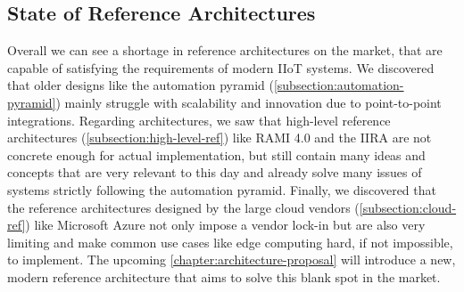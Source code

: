 \subsection{State of Reference Architectures}
    Overall we can see a shortage in reference architectures on the market, that are capable of satisfying the requirements of modern  IIoT systems. We discovered that older designs like the automation pyramid (\autoref{subsection:automation-pyramid}) mainly struggle with scalability and innovation due to point-to-point integrations. Regarding architectures, we saw that high-level reference architectures (\autoref{subsection:high-level-ref}) like RAMI 4.0 and the IIRA are not concrete enough for actual implementation, but still contain many ideas and concepts that are very relevant to this day and already solve many issues of systems strictly following the automation pyramid. Finally, we discovered that the reference architectures designed by the large cloud vendors (\autoref{subsection:cloud-ref}) like Microsoft Azure not only impose a vendor lock-in but are also very limiting and make common use cases like edge computing hard, if not impossible, to implement. The upcoming \autoref{chapter:architecture-proposal} will introduce a new, modern reference architecture that aims to solve this blank spot in the market.
